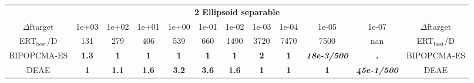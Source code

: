\begin{tabular}{cccccccccccc}
 & \multicolumn{10}{c}{{\normalsize \textbf{2 Ellipsoid separable}}}\\
$\Delta$ftarget& 1e+03& 1e+02& 1e+01& 1e+00& 1e-01& 1e-02& 1e-03& 1e-04& 1e-05& 1e-07 & $\Delta$ftarget \\
ERT$_{\textrm{best}}$/D& 131& 279& 406& 539& 660& 1490& 3720& 7470& 7500& nan & ERT$_{\textrm{best}}$/D \\
\hline
BIPOPCMA-ES & \textbf{1.3} & \textbf{1} & \textbf{1} & \textbf{1} & \textbf{1} & \textbf{1} & \textbf{2} & \textbf{1} & \textbf{\textit{18e-3}\textit{/500}} & \textbf{.} & BIPOPCMA-ES \cite{add_an_entry_for_BIPOPCMA-ES_in_bbob.bib}\\
DEAE & \textbf{1} & \textbf{1.1} & \textbf{1.6} & \textbf{3.2} & \textbf{3.6} & \textbf{1.6} & \textbf{1} & \textbf{1} & \textbf{1} & \textbf{\textit{45e-1}\textit{/500}} & DEAE \cite{add_an_entry_for_DEAE_in_bbob.bib}
\end{tabular}
